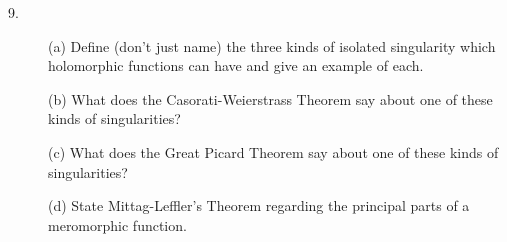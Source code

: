 \documentclass{article}
\begin{document}
\begin{description}
\item[9.] (a)
Define (don't just name) the three kinds of isolated singularity which
holomorphic functions can have and give an example of each.

\item[\quad] (b)
What does the Casorati-Weierstrass Theorem say about one of these kinds of
singularities?

\item[\quad] (c)
What does the Great Picard Theorem say about one of these kinds of
singularities?

\item[\quad] (d)
State Mittag-Leffler's Theorem regarding the principal parts of a meromorphic
function.





\end{description}    
\end{document}
